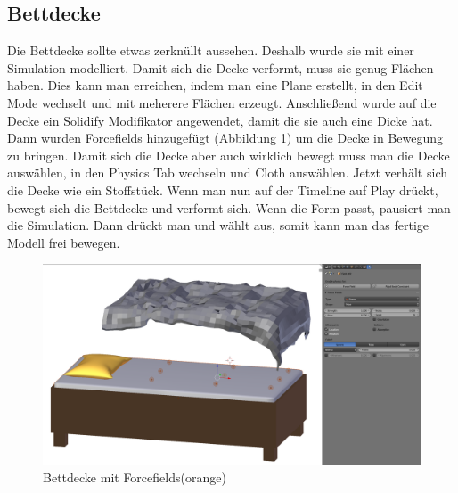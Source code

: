 \subsection{Bettdecke}
Die Bettdecke sollte etwas zerknüllt aussehen. Deshalb wurde sie mit einer Simulation modelliert. Damit sich die Decke verformt, muss sie genug Flächen haben.
Dies kann man erreichen, indem man eine Plane erstellt, in den Edit Mode wechselt und mit   meherere Flächen erzeugt. Anschließend wurde auf die Decke ein Solidify Modifikator
angewendet, damit die sie auch eine Dicke hat.
Dann wurden Forcefields hinzugefügt (Abbildung \ref{Bettdecke:image1}) um die Decke in Bewegung zu bringen. Damit sich die Decke aber auch wirklich bewegt muss man die Decke auswählen,
in den Physics Tab wechseln und Cloth auswählen. Jetzt verhält sich die Decke wie ein Stoffstück. Wenn man nun auf der Timeline auf Play drückt, bewegt sich die Bettdecke und verformt sich.
Wenn die Form passt, pausiert man die Simulation. Dann drückt man  und wählt  aus, somit kann man das fertige Modell
frei bewegen.

\begin{figure}[H]
    \centering
    \includegraphics[width=.8\textwidth]{images/Bettdecke_Forcefields.png}
    \caption{Bettdecke mit Forcefields(orange)}
    \label{Bettdecke:image1}
\end{figure}
\flushbottom